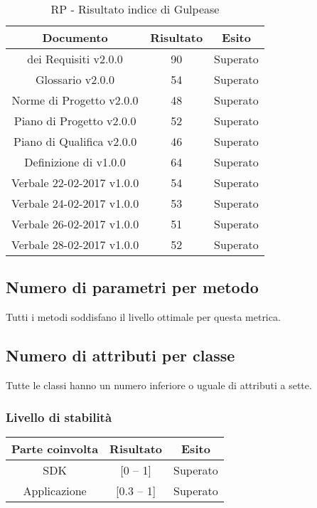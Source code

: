 \begin{table}[h]
	\begin{center}
		\begin{tabular}{|c|c|c|}
			\hline
			\textbf{Documento}	& \textbf{Risultato} & \textbf{Esito} \\
			\hline
		 \termine{Analisi} dei Requisiti v2.0.0 &	90 & Superato\\
			\hline
			Glossario v2.0.0 &	54 & Superato\\
			\hline
			Norme di Progetto v2.0.0 &	48 & Superato\\
			\hline
			Piano di Progetto v2.0.0	&	52 & Superato\\
			\hline
			Piano di Qualifica v2.0.0	&	46 & Superato\\
			\hline
			Definizione di \termine{Prodotto} v1.0.0	&	64 & Superato\\
			\hline
			Verbale 22-02-2017 v1.0.0	&	54 & Superato\\
			\hline
			Verbale 24-02-2017 v1.0.0	&	53 & Superato\\
			\hline
			Verbale 26-02-2017 v1.0.0	&	51 & Superato\\
			\hline
						Verbale 28-02-2017 v1.0.0	&	52 & Superato\\
			\hline
		\end{tabular}
	\end{center}
	\caption{RP - Risultato indice di Gulpease}
\end{table}

\newpage

\subsection{Numero di parametri per metodo}

Tutti i metodi soddisfano il livello ottimale per questa metrica.

\subsection{Numero di attributi per classe}

Tutte le classi hanno un numero inferiore o uguale di attributi a sette.

\subsubsection{Livello di stabilità}

\begin{center}
	\begin{tabular}{|c|c|c|}
	\hline
	\textbf{Parte coinvolta} & \textbf{Risultato} & \textbf{Esito} \\
	\hline
	SDK & [0 -- 1] & Superato \\
	\hline
	Applicazione & [0.3 -- 1] & Superato \\
	\hline
	\end{tabular}
\end{center}

